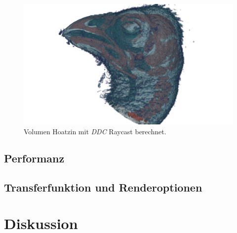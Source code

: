 \begin{landscape}
	\begin{figure}
		\centering
		\includegraphics[width=1\textheight]{../../Grafiken/results/picture_quality/hoatzin/DDC_img-1_ray-1-5.png}
		\caption{Volumen Hoatzin mit \emph{DDC} Raycast berechnet.}
		\label{fig::res::hoa_ddc}
	\end{figure}
\end{landscape}
\fi

\subsection{Performanz}

\subsection{Transferfunktion und Renderoptionen}

\section*{Diskussion}\label{sec::disc}
